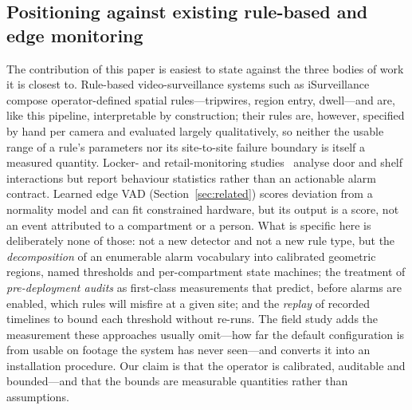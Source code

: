 \documentclass[journal,article,submit,oneauthor]{Definitions/mdpi}
\begin{document}
\subsection{Positioning against existing rule-based and edge monitoring}
The contribution of this paper is easiest to state against the three bodies of work it is
closest to. Rule-based video-surveillance systems such as
iSurveillance~\cite{lim2014isurveillance} compose operator-defined spatial rules---tripwires,
region entry, dwell---and are, like this pipeline, interpretable by construction; their rules
are, however, specified by hand per camera and evaluated largely qualitatively, so neither the
usable range of a rule's parameters nor its site-to-site failure boundary is itself a measured
quantity. Locker- and retail-monitoring studies~\cite{ramoa2021door,santra2019retail} analyse
door and shelf interactions but report behaviour statistics rather than an actionable alarm
contract. Learned edge VAD (Section~\ref{sec:related}) scores deviation from a normality model
and can fit constrained hardware, but its output is a score, not an event attributed to a
compartment or a person. What is specific here is deliberately none of those: not a new
detector and not a new rule type, but the \emph{decomposition} of an enumerable alarm
vocabulary into calibrated geometric regions, named thresholds and per-compartment state
machines; the treatment of \emph{pre-deployment audits} as first-class measurements that
predict, before alarms are enabled, which rules will misfire at a given site; and the
\emph{replay} of recorded timelines to bound each threshold without re-runs. The field study
adds the measurement these approaches usually omit---how far the default configuration is from
usable on footage the system has never seen---and converts it into an installation procedure.
Our claim is that the operator is calibrated, auditable and bounded---and that the bounds
are measurable quantities rather than assumptions.
\end{document}
